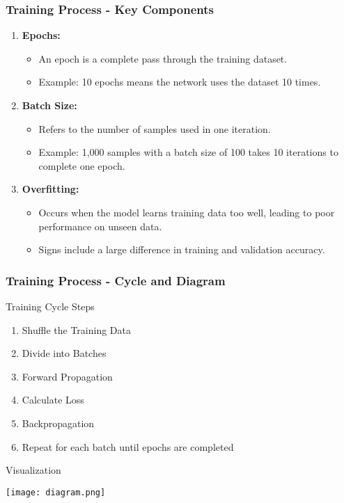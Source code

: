 \documentclass[aspectratio=169]{beamer}
\begin{document}
\begin{frame}[fragile]
    \frametitle{Training Process - Key Components}
    \begin{enumerate}
        \item \textbf{Epochs:}
            \begin{itemize}
                \item An epoch is a complete pass through the training dataset.
                \item Example: 10 epochs means the network uses the dataset 10 times.
            \end{itemize}
        
        \item \textbf{Batch Size:}
            \begin{itemize}
                \item Refers to the number of samples used in one iteration.
                \item Example: 1,000 samples with a batch size of 100 takes 10 iterations to complete one epoch.
            \end{itemize}
        
        \item \textbf{Overfitting:}
            \begin{itemize}
                \item Occurs when the model learns training data too well, leading to poor performance on unseen data.
                \item Signs include a large difference in training and validation accuracy.
            \end{itemize}
    \end{enumerate}
\end{frame}

\begin{frame}[fragile]
    \frametitle{Training Process - Cycle and Diagram}
    \begin{block}{Training Cycle Steps}
        \begin{enumerate}
            \item Shuffle the Training Data
            \item Divide into Batches
            \item Forward Propagation
            \item Calculate Loss
            \item Backpropagation
            \item Repeat for each batch until epochs are completed
        \end{enumerate}
    \end{block}
    
    \begin{block}{Visualization}
        \begin{center}
            \texttt{[image: diagram.png]} %
        \end{center}
    \end{block}
\end{frame}
\end{document}
